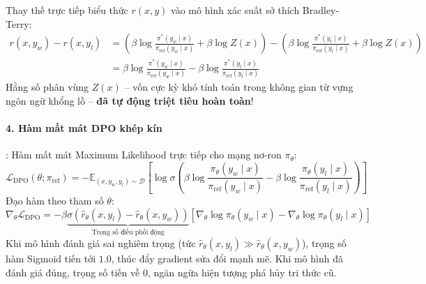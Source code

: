 Thay thế trực tiếp biểu thức $r(x, y)$ vào mô hình xác suất sở thích Bradley-Terry:
\begin{align}
r(x, y_w) - r(x, y_l) &= \left( \beta \log \frac{\pi^*(y_w \mid x)}{\pi_{\text{ref}}(y_w \mid x)} + \beta \log Z(x) \right) - \left( \beta \log \frac{\pi^*(y_l \mid x)}{\pi_{\text{ref}}(y_l \mid x)} + \beta \log Z(x) \right) \nonumber \\
&= \beta \log \frac{\pi^*(y_w \mid x)}{\pi_{\text{ref}}(y_w \mid x)} - \beta \log \frac{\pi^*(y_l \mid x)}{\pi_{\text{ref}}(y_l \mid x)}
\end{align}
Hằng số phân vùng $Z(x)$ -- vốn cực kỳ khó tính toán trong không gian từ vựng ngôn ngữ khổng lồ -- \textbf{đã tự động triệt tiêu hoàn toàn}!

\paragraph{4. Hàm mất mát DPO khép kín}:
Hàm mất mát Maximum Likelihood trực tiếp cho mạng nơ-ron $\pi_\theta$:
\begin{equation}
\mathcal{L}_{\text{DPO}}(\theta; \pi_{\text{ref}}) = - \mathbb{E}_{(x, y_w, y_l) \sim \mathcal{D}} \left[ \log \sigma \left( \beta \log \frac{\pi_\theta(y_w \mid x)}{\pi_{\text{ref}}(y_w \mid x)} - \beta \log \frac{\pi_\theta(y_l \mid x)}{\pi_{\text{ref}}(y_l \mid x)} \right) \right]
\end{equation}
Đạo hàm theo tham số $\theta$:
\begin{equation}
\nabla_\theta \mathcal{L}_{\text{DPO}} = - \beta \underbrace{\sigma\left( \hat{r}_\theta(x, y_l) - \hat{r}_\theta(x, y_w) \right)}_{\text{Trọng số điều phối động}} \left[ \nabla_\theta \log \pi_\theta(y_w \mid x) - \nabla_\theta \log \pi_\theta(y_l \mid x) \right]
\end{equation}
Khi mô hình đánh giá sai nghiêm trọng (tức $\hat{r}_\theta(x, y_l) \gg \hat{r}_\theta(x, y_w)$), trọng số hàm Sigmoid tiến tới $1.0$, thúc đẩy gradient sửa đổi mạnh mẽ. Khi mô hình đã đánh giá đúng, trọng số tiến về 0, ngăn ngừa hiện tượng phá hủy tri thức cũ.

